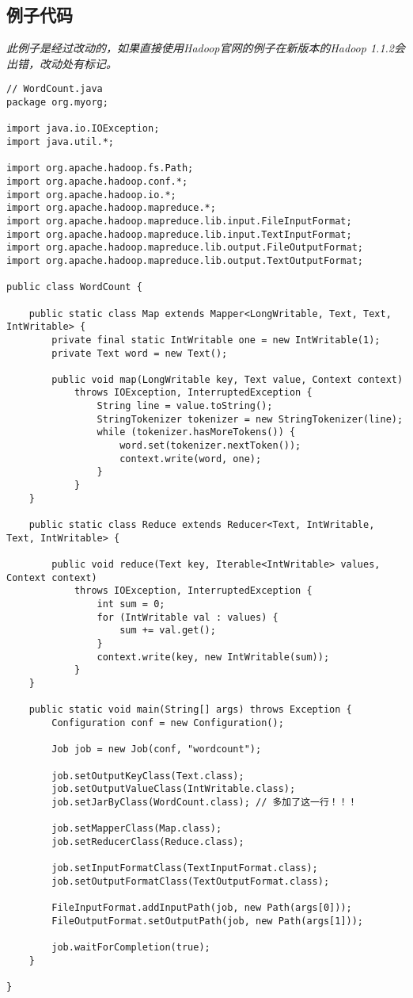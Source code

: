 \documentclass{article}
\begin{document}
\subsection{例子代码}
\textit{此例子是经过改动的，如果直接使用Hadoop官网的例子在新版本的Hadoop 1.1.2会出错，改动处有标记。}
\begin{verbatim}
// WordCount.java
package org.myorg;

import java.io.IOException;
import java.util.*;

import org.apache.hadoop.fs.Path;
import org.apache.hadoop.conf.*;
import org.apache.hadoop.io.*;
import org.apache.hadoop.mapreduce.*;
import org.apache.hadoop.mapreduce.lib.input.FileInputFormat;
import org.apache.hadoop.mapreduce.lib.input.TextInputFormat;
import org.apache.hadoop.mapreduce.lib.output.FileOutputFormat;
import org.apache.hadoop.mapreduce.lib.output.TextOutputFormat;

public class WordCount {

	public static class Map extends Mapper<LongWritable, Text, Text, IntWritable> {
		private final static IntWritable one = new IntWritable(1);
		private Text word = new Text();

		public void map(LongWritable key, Text value, Context context) 
			throws IOException, InterruptedException {
				String line = value.toString();
				StringTokenizer tokenizer = new StringTokenizer(line);
				while (tokenizer.hasMoreTokens()) {
					word.set(tokenizer.nextToken());
					context.write(word, one);
				}
			}
	} 

	public static class Reduce extends Reducer<Text, IntWritable, Text, IntWritable> {

		public void reduce(Text key, Iterable<IntWritable> values, Context context) 
			throws IOException, InterruptedException {
				int sum = 0;
				for (IntWritable val : values) {
					sum += val.get();
				}
				context.write(key, new IntWritable(sum));
			}
	}

	public static void main(String[] args) throws Exception {
		Configuration conf = new Configuration();

		Job job = new Job(conf, "wordcount");

		job.setOutputKeyClass(Text.class);
		job.setOutputValueClass(IntWritable.class);
		job.setJarByClass(WordCount.class); // 多加了这一行！！！

		job.setMapperClass(Map.class);
		job.setReducerClass(Reduce.class);

		job.setInputFormatClass(TextInputFormat.class);
		job.setOutputFormatClass(TextOutputFormat.class);

		FileInputFormat.addInputPath(job, new Path(args[0]));
		FileOutputFormat.setOutputPath(job, new Path(args[1]));

		job.waitForCompletion(true);
	}

}
\end{verbatim}
\end{document}
